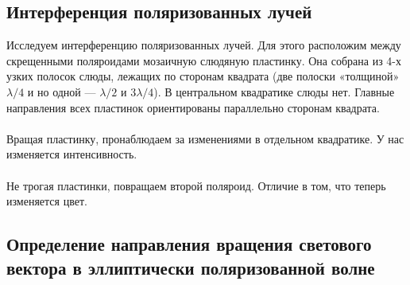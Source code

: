 \documentclass[a4paper,12pt]{article} %
\begin{document}
\subsection{Интерференция поляризованных лучей}
Исследуем интерференцию поляризованных лучей. Для этого расположим между скрещенными поляроидами мозаичную слюдяную пластинку. Она собрана из 4-х узких полосок слюды, лежащих по сторонам квадрата (две полоски «толщиной» $ \lambda / 4 $ и но одной — $ \lambda / 2 $ и $ 3 \lambda / 4 $). В центральном квадратике слюды нет. Главные направления всех пластинок ориентированы параллельно сторонам квадрата.
\\\\
Вращая пластинку, пронаблюдаем за изменениями в отдельном квадратике. У нас изменяется интенсивность.
\\\\
Не трогая пластинки, повращаем второй поляроид. Отличие в том, что теперь изменяется цвет.

\subsection{Определение направления вращения светового вектора в эллиптически поляризованной волне}
\end{document}

